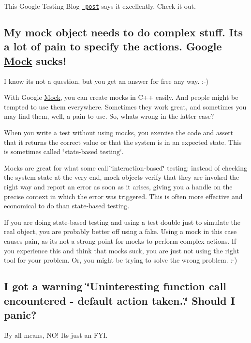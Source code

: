 This Google Testing Blog \href{https://testing.googleblog.com/2008/06/defeat-static-cling.html}{\texttt{ post}} says it excellently. Check it out.

\subsection*{My mock object needs to do complex stuff. It\textquotesingle{}s a lot of pain to specify the actions. Google \mbox{\hyperlink{class_mock}{Mock}} sucks!}

I know it\textquotesingle{}s not a question, but you get an answer for free any way. \+:-\/)

With Google \mbox{\hyperlink{class_mock}{Mock}}, you can create mocks in C++ easily. And people might be tempted to use them everywhere. Sometimes they work great, and sometimes you may find them, well, a pain to use. So, what\textquotesingle{}s wrong in the latter case?

When you write a test without using mocks, you exercise the code and assert that it returns the correct value or that the system is in an expected state. This is sometimes called \char`\"{}state-\/based testing\char`\"{}.

Mocks are great for what some call \char`\"{}interaction-\/based\char`\"{} testing\+: instead of checking the system state at the very end, mock objects verify that they are invoked the right way and report an error as soon as it arises, giving you a handle on the precise context in which the error was triggered. This is often more effective and economical to do than state-\/based testing.

If you are doing state-\/based testing and using a test double just to simulate the real object, you are probably better off using a fake. Using a mock in this case causes pain, as it\textquotesingle{}s not a strong point for mocks to perform complex actions. If you experience this and think that mocks suck, you are just not using the right tool for your problem. Or, you might be trying to solve the wrong problem. \+:-\/)

\subsection*{I got a warning \char`\"{}\+Uninteresting function call encountered -\/ default action taken..\char`\"{} Should I panic?}

By all means, N\+O! It\textquotesingle{}s just an F\+YI.

